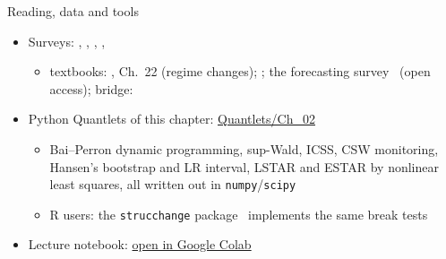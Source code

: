\begin{frame}{Reading, data and tools}
\itemsize{\small}
\begin{itemize}
    \item Surveys: , , , , 
    \begin{itemize}
        \item textbooks: , Ch.~22 (regime changes); ; the forecasting survey \ (open access); bridge: 
    \end{itemize}
    \item Python Quantlets of this chapter: \href{https://github.com/danpele/Advanced-Time-Series/tree/main/Quantlets/Ch_02}{Quantlets/Ch\_02}
    \begin{itemize}
        \item Bai--Perron dynamic programming, sup-Wald, ICSS, CSW monitoring, Hansen's bootstrap and LR interval, LSTAR and ESTAR by nonlinear least squares, all written out in \texttt{numpy}/\texttt{scipy}
        \item R users: the \texttt{strucchange} package \ implements the same break tests
    \end{itemize}
    \item Lecture notebook: \href{\colaburl{notebooks/EN/chapter2_lecture_notebook.ipynb}}{open in Google Colab}
\end{itemize}
\end{frame}

